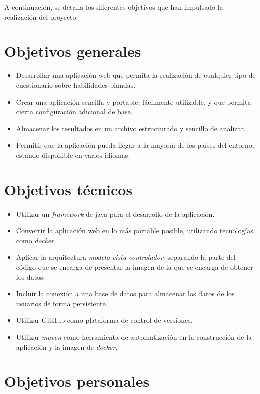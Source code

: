 
A continuación, se detalla los diferentes objetivos que han impulsado la realización del proyecto.

\section{Objetivos generales}

\begin{itemize}
	\item Desarrollar una aplicación web que permita la realización de cualquier tipo de cuestionario sobre habilidades blandas.
	\item Crear una aplicación sencilla y portable, fácilmente utilizable, y que permita cierta configuración adicional de base.
	\item Almacenar los resultados en un archivo estructurado y sencillo de analizar.
	\item Permitir que la aplicación pueda llegar a la mayoría de los países del entorno, estando disponible en varios idiomas.
\end{itemize}



\section{Objetivos técnicos}


\begin{itemize}
	\item Utilizar un \textit{framework} de java para el desarrollo de la aplicación.
	\item Convertir la aplicación web en lo más portable posible, utilizando tecnologías como \textit{docker}.
	\item Aplicar la arquitectura \textit{modelo-vista-controlador}. separando la parte del código que se encarga de presentar la imagen de la que se encarga de obtener los datos.
	\item Incluir la conexión a una base de datos para almacenar los datos de los usuarios de forma persistente.
	\item Utilizar GitHub como plataforma de control de versiones.
	\item Utilizar \textit{maven} como herramienta de automatización en la construcción de la aplicación y la imagen de \textit{docker}.
\end{itemize}

\section{Objetivos personales}

